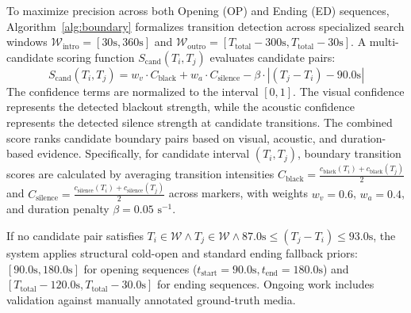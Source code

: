 \documentclass[conference]{IEEEtran}
\begin{document}
To maximize precision across both Opening (OP) and Ending (ED) sequences, Algorithm~\ref{alg:boundary} formalizes transition detection across specialized search windows $\mathcal{W}_{\text{intro}} = [30\text{s}, 360\text{s}]$ and $\mathcal{W}_{\text{outro}} = [T_{\text{total}} - 300\text{s}, T_{\text{total}} - 30\text{s}]$. A multi-candidate scoring function $S_{\text{cand}}(T_i, T_j)$ evaluates candidate pairs:
\begin{equation}
S_{\text{cand}}(T_i, T_j) = w_v \cdot C_{\text{black}} + w_a \cdot C_{\text{silence}} - \beta \cdot |(T_j - T_i) - 90.0\text{s}|
\label{eq:cand_score}
\end{equation}
The confidence terms are normalized to the interval $[0, 1]$. The visual confidence represents the detected blackout strength, while the acoustic confidence represents the detected silence strength at candidate transitions. The combined score ranks candidate boundary pairs based on visual, acoustic, and duration-based evidence. Specifically, for candidate interval $(T_i, T_j)$, boundary transition scores are calculated by averaging transition intensities $C_{\text{black}} = \frac{c_{\text{black}}(T_i) + c_{\text{black}}(T_j)}{2}$ and $C_{\text{silence}} = \frac{c_{\text{silence}}(T_i) + c_{\text{silence}}(T_j)}{2}$ across markers, with weights $w_v = 0.6$, $w_a = 0.4$, and duration penalty $\beta = 0.05\text{ s}^{-1}$.

If no candidate pair satisfies $T_i \in \mathcal{W} \land T_j \in \mathcal{W} \land 87.0\text{s} \le (T_j - T_i) \le 93.0\text{s}$, the system applies structural cold-open and standard ending fallback priors: $[90.0\text{s}, 180.0\text{s}]$ for opening sequences ($t_{\text{start}} = 90.0\text{s}, t_{\text{end}} = 180.0\text{s}$) and $[T_{\text{total}} - 120.0\text{s}, T_{\text{total}} - 30.0\text{s}]$ for ending sequences. Ongoing work includes validation against manually annotated ground-truth media.
\end{document}
